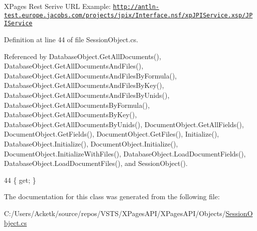 X\+Pages Rest Serive U\+RL Example\+: \href{http://antln-test.europe.jacobs.com/projects/jpix/Interface.nsf/xpJPIService.xsp/JPIService}{\tt http\+://antln-\/test.\+europe.\+jacobs.\+com/projects/jpix/\+Interface.\+nsf/xp\+J\+P\+I\+Service.\+xsp/\+J\+P\+I\+Service} 



Definition at line 44 of file Session\+Object.\+cs.



Referenced by Database\+Object.\+Get\+All\+Documents(), Database\+Object.\+Get\+All\+Documents\+And\+Files(), Database\+Object.\+Get\+All\+Documents\+And\+Files\+By\+Formula(), Database\+Object.\+Get\+All\+Documents\+And\+Files\+By\+Key(), Database\+Object.\+Get\+All\+Documents\+And\+Files\+By\+Unids(), Database\+Object.\+Get\+All\+Documents\+By\+Formula(), Database\+Object.\+Get\+All\+Documents\+By\+Key(), Database\+Object.\+Get\+All\+Documents\+By\+Unids(), Document\+Object.\+Get\+All\+Fields(), Document\+Object.\+Get\+Fields(), Document\+Object.\+Get\+Files(), Initialize(), Database\+Object.\+Initialize(), Document\+Object.\+Initialize(), Document\+Object.\+Initialize\+With\+Files(), Database\+Object.\+Load\+Document\+Fields(), Database\+Object.\+Load\+Document\+Files(), and Session\+Object().


\begin{DoxyCode}
44 \{ \textcolor{keyword}{get}; \}
\end{DoxyCode}


The documentation for this class was generated from the following file\+:\begin{DoxyCompactItemize}
\item 
C\+:/\+Users/\+Acketk/source/repos/\+V\+S\+T\+S/\+X\+Pages\+A\+P\+I/\+X\+Pages\+A\+P\+I/\+Objects/\mbox{\hyperlink{_session_object_8cs}{Session\+Object.\+cs}}\end{DoxyCompactItemize}
